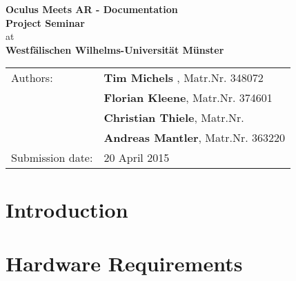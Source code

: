



	\begin{center}
		\vspace*{54mm}
		{
			\renewcommand{\baselinestretch}{0.9}\normalsize
			\Large
			\textbf{Oculus Meets AR - Documentation}\\
		}
		\vspace*{15.5mm}
		{
			\large
			\textbf{Project Seminar}\\
		}
		\vspace*{10mm}
		{
			at\\
			\textbf{Westfälischen Wilhelms-Universität Münster}\\
		}
		\vspace*{100mm}
		\begin{tabular*}{137mm}{ll}
			Authors: 		& \textbf{Tim Michels }, Matr.Nr. 348072\\
						& \textbf{Florian Kleene}, Matr.Nr. 374601\\
						& \textbf{Christian Thiele}, Matr.Nr. \\
						& \textbf{Andreas Mantler}, Matr.Nr. 363220\\
			Submission date: 	& 20 April 2015
		\end{tabular*}
	\end{center}
	\newpage
	
	\thispagestyle{empty}\quad\newpage
	
	\thispagestyle{empty}
	\tableofcontents
	\vfill
	\newpage

	\thispagestyle{empty}\quad\newpage
	
	\setcounter{page}{1}
	\pagestyle{scrheadings}
	\setfootsepline{0pt} 
	\ihead[\chaptername\ \thechapter: \leftmark]{\chaptername\ \thechapter: \leftmark}
	\cfoot[\vspace*{9mm}\pagemark]{\vspace*{9mm}\pagemark}
	\renewcommand{\baselinestretch}{1.3}\normalsize

	\chapter{Introduction}
	\label{sec:introduction}
		

	\chapter{Hardware Requirements}
	\label{sec:hardware_requirements}
	
	
